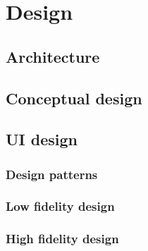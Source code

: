 \chapter{Design}

\section{Architecture}

\section{Conceptual design}

\section{UI design}
\subsection{Design patterns}
\subsection{Low fidelity design}
\subsection{High fidelity design}

